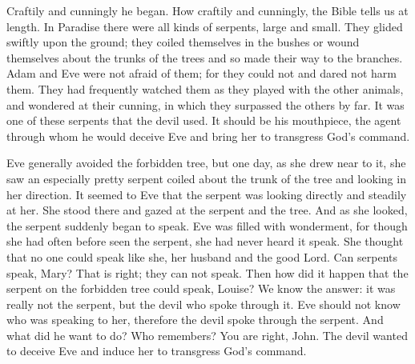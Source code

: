 Craftily and cunningly he began. How craftily and cunningly, the Bible tells us at length. In Paradise there were all kinds of
serpents, large and small. They glided swiftly upon the ground; they coiled themselves in the bushes or wound themselves about the trunks of the trees and so made their way to the branches. Adam and Eve were not afraid of them; for they could not and dared not harm them. They had frequently watched them as they played with the other animals, and wondered at their cunning, in which they surpassed the others by far. It was one of these serpents that the devil used. It should be his mouthpiece, the agent through whom he would deceive Eve and bring her to transgress God’s command.

Eve generally avoided the forbidden tree, but one day, as she drew near to it, she saw an especially pretty serpent coiled about the trunk of the tree and looking in her direction. It seemed to Eve that the serpent was looking directly and steadily at her. She stood there and gazed at the serpent and the tree. And as she looked, the serpent suddenly began to speak. Eve was filled with wonderment, for though she had often before seen the serpent, she had never heard it speak. She thought that no one could speak like she, her husband and the good Lord. Can serpents speak, Mary? That is right; they can not speak. Then how did it happen that the serpent on the forbidden tree could speak, Louise? We know the answer: it was really not the serpent, but the devil who spoke through it. Eve should not know who was speaking to her, therefore the devil spoke through the serpent. And what did he want to do? Who remembers? You are right, John. The devil wanted to deceive Eve and induce her to transgress God’s command.

